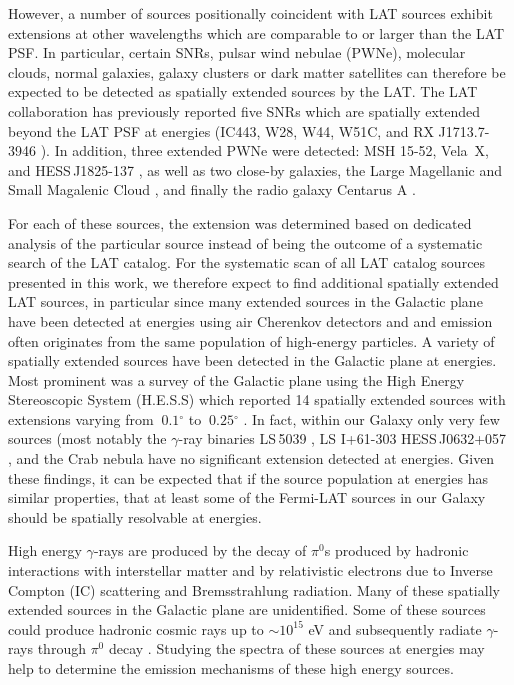 \documentclass[12pt,preprint]{aastex}
\newcommand{\gev}{\text{GeV}\xspace}
\newcommand{\tev}{\text{TeV}\xspace}
\renewcommand{\deg}{\ensuremath{^\circ}\xspace}
\renewcommand{\approx}{\sim\!\xspace}
\begin{document}
However, a number of sources positionally coincident with LAT sources
exhibit extensions at other wavelengths which are comparable to or larger than 
the LAT PSF.  In particular, certain SNRs, pulsar wind nebulae (PWNe),
molecular clouds, normal galaxies, galaxy clusters or dark matter
satellites can therefore be expected to be detected as spatially extended
sources by the LAT.  
The LAT collaboration has previously reported five SNRs which are
spatially extended beyond the LAT PSF at \gev energies 
(IC443, W28, W44,
W51C, and RX J1713.7-3946 \citep{ic443,w28,w44,w51c,rx_j1713_lat}). In
addition, three extended PWNe were detected: MSH 15-52, Vela~X,
and HESS\,J1825-137 \citep{msh1552,velax,fermi_hess_j1825}, as well
as two close-by galaxies, the Large Magellanic and Small Magalenic
Cloud \citep{lmc,smc}, and finally the radio galaxy Centarus A
\citep{cen_a_lat}.

For each of these sources, the extension was determined based on
dedicated analysis of the particular source 
instead of being the outcome of a systematic search of the LAT catalog.
For the systematic scan of all LAT catalog sources presented in this work, we
therefore expect to find additional spatially extended LAT sources, in
particular since many extended sources in the Galactic plane have been
detected at \tev energies using air Cherenkov detectors and \tev and
\gev emission often originates from the same population of high-energy
particles.  A variety of spatially extended sources have been detected
in the Galactic plane at \tev energies. Most prominent was a survey of
the Galactic plane using the High Energy Stereoscopic System (H.E.S.S)
which reported 14 spatially extended sources
 with extensions varying from
$~0.1\deg$ to $~0.25\deg$ \citep{hess_plane_survey}.
In fact, within
our Galaxy only very few sources (most notably the $\gamma$-ray binaries
LS\,5039 \citep{HESSLS5039}, LS I+61-303 \citep{MAGICLSI, VERITASLSI}
HESS\,J0632+057 \citep{HESS0632}, and the Crab nebula \citep{crab_weekes}
have 
no significant extension detected at \tev energies. Given
these findings, it can be expected that if the source population at \gev
energies has similar properties, that at least some of the Fermi-LAT
sources in our Galaxy should be spatially resolvable at \gev energies.

\begin{shaded} 
High energy $\gamma$-rays are produced by the decay of $\pi^0$s produced
by hadronic interactions with interstellar matter and by relativistic
electrons due to Inverse Compton (IC) scattering and Bremsstrahlung
radiation.  Many of these spatially extended \tev sources in the
Galactic plane are unidentified. Some of these sources could produce
hadronic cosmic rays up to $\approx 10^{15}$ eV and subsequently radiate
$\gamma$-rays through $\pi^0$ decay \citep{blandford_and_eichler_1987}.
Studying the spectra of these \tev sources at \gev energies may help to
determine the emission mechanisms of these high energy sources.
\end{shaded} 
\end{document}
